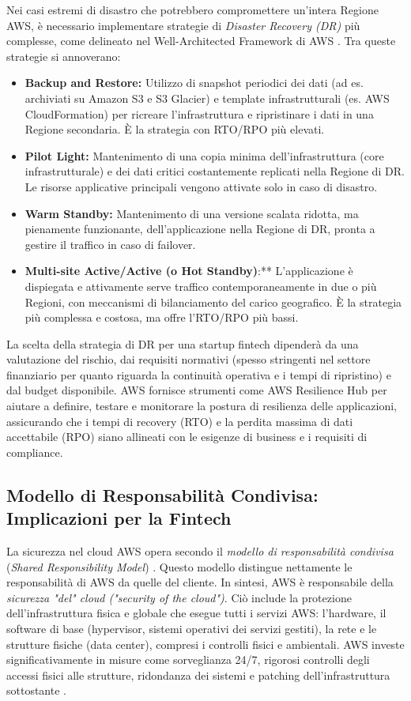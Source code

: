 Nei casi estremi di disastro che potrebbero compromettere un'intera Regione AWS, è necessario implementare strategie di \textit{Disaster Recovery (DR)} più complesse, come delineato nel Well-Architected Framework di AWS \cite{awsWellArchitected}. Tra queste strategie si annoverano:
\begin{itemize}
    \item \textbf{Backup and Restore:} Utilizzo di snapshot periodici dei dati (ad es. archiviati su Amazon S3 e S3 Glacier) e template infrastrutturali (es. AWS CloudFormation) per ricreare l'infrastruttura e ripristinare i dati in una Regione secondaria. È la strategia con RTO/RPO più elevati.
    \item \textbf{Pilot Light:} Mantenimento di una copia minima dell'infrastruttura (core infrastrutturale) e dei dati critici costantemente replicati nella Regione di DR. Le risorse applicative principali vengono attivate solo in caso di disastro.
    \item \textbf{Warm Standby:} Mantenimento di una versione scalata ridotta, ma pienamente funzionante, dell'applicazione nella Regione di DR, pronta a gestire il traffico in caso di failover.
    \item \textbf{Multi-site Active/Active (o Hot Standby)}:** L'applicazione è dispiegata e attivamente serve traffico contemporaneamente in due o più Regioni, con meccanismi di bilanciamento del carico geografico. È la strategia più complessa e costosa, ma offre l'RTO/RPO più bassi.
\end{itemize}
La scelta della strategia di DR per una startup fintech dipenderà da una valutazione del rischio, dai requisiti normativi (spesso stringenti nel settore finanziario per quanto riguarda la continuità operativa e i tempi di ripristino) e dal budget disponibile. AWS fornisce strumenti come AWS Resilience Hub \cite{aws-resilience} per aiutare a definire, testare e monitorare la postura di resilienza delle applicazioni, assicurando che i tempi di recovery (RTO) e la perdita massima di dati accettabile (RPO) siano allineati con le esigenze di business e i requisiti di compliance.

\subsection{Modello di Responsabilità Condivisa: Implicazioni per la Fintech}
\label{sec:shared-responsibility-fintech}

La sicurezza nel cloud AWS opera secondo il \textit{modello di responsabilità condivisa} (\textit{Shared Responsibility Model}) \cite{aws-shared-responsibility}. Questo modello distingue nettamente le responsabilità di AWS da quelle del cliente. In sintesi, AWS è responsabile della \textit{sicurezza "del" cloud ("security of the cloud")}. Ciò include la protezione dell'infrastruttura fisica e globale che esegue tutti i servizi AWS: l'hardware, il software di base (hypervisor, sistemi operativi dei servizi gestiti), la rete e le strutture fisiche (data center), compresi i controlli fisici e ambientali. AWS investe significativamente in misure come sorveglianza 24/7, rigorosi controlli degli accessi fisici alle strutture, ridondanza dei sistemi e patching dell'infrastruttura sottostante \cite{aws-shared-responsibility}.

